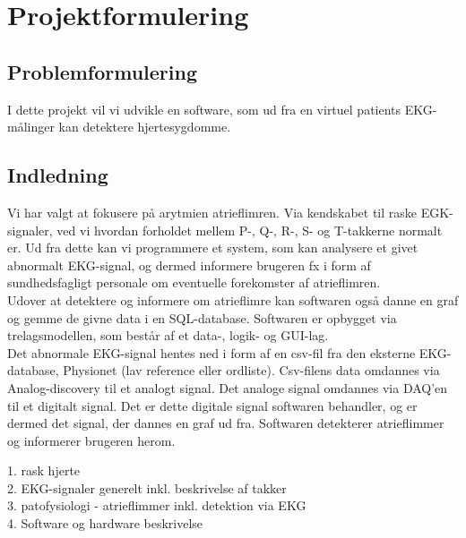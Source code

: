 \chapter{Projektformulering}
\section{Problemformulering}
 I dette projekt vil vi udvikle en software, som ud fra en virtuel patients EKG-målinger kan detektere hjertesygdomme. 
\section{Indledning}
Vi har valgt at fokusere på arytmien atrieflimren. Via kendskabet til raske EGK-signaler, ved vi hvordan forholdet mellem P-, Q-, R-, S- og T-takkerne normalt er. Ud fra dette kan vi programmere et system, som kan analysere et givet abnormalt EKG-signal, og dermed informere brugeren fx i form af sundhedsfagligt personale om eventuelle forekomster af atrieflimren.\\
Udover at detektere og informere om atrieflimre kan softwaren også danne en graf og gemme de givne data i en SQL-database. Softwaren er opbygget via trelagsmodellen, som består af et data-, logik- og GUI-lag.
\\ 
Det abnormale EKG-signal hentes ned i form af en csv-fil fra den eksterne EKG-database, Physionet (lav reference eller ordliste). Csv-filens data omdannes via Analog-discovery til et analogt signal. Det analoge signal omdannes via DAQ'en til et digitalt signal. Det er dette digitale signal softwaren behandler, og er dermed det signal, der dannes en graf ud fra. Softwaren detekterer atrieflimmer og informerer brugeren herom.     


1. rask hjerte\\
2. EKG-signaler generelt inkl. beskrivelse af takker\\
3. patofysiologi - atrieflimmer inkl. detektion via EKG\\
4. Software og hardware beskrivelse